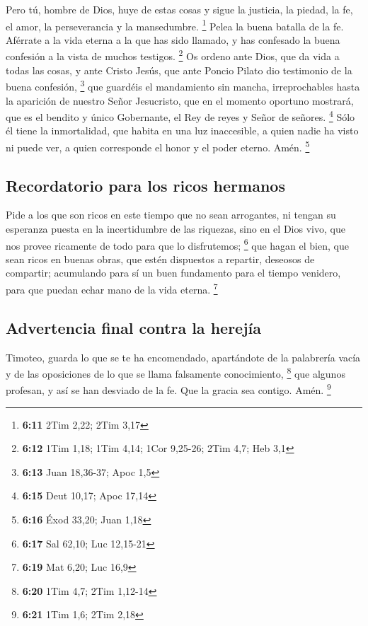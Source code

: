 \begin{paracol}{2}
 Pero tú, hombre de Dios, huye de estas cosas y sigue la
justicia, la piedad, la fe, el amor, la perseverancia y la mansedumbre.
\footnote{\textbf{6:11} 2Tim 2,22; 2Tim 3,17}  Pelea la
buena batalla de la fe. Aférrate a la vida eterna a la que has sido
llamado, y has confesado la buena confesión a la vista de muchos
testigos. \footnote{\textbf{6:12} 1Tim 1,18; 1Tim 4,14; 1Cor 9,25-26;
  2Tim 4,7; Heb 3,1}  Os ordeno ante Dios, que da vida a
todas las cosas, y ante Cristo Jesús, que ante Poncio Pilato dio
testimonio de la buena confesión, \footnote{\textbf{6:13} Juan 18,36-37;
  Apoc 1,5}  que guardéis el mandamiento sin mancha,
irreprochables hasta la aparición de nuestro Señor Jesucristo,
 que en el momento oportuno mostrará, que es el bendito y
único Gobernante, el Rey de reyes y Señor de señores. \footnote{\textbf{6:15}
  Deut 10,17; Apoc 17,14}  Sólo él tiene la inmortalidad,
que habita en una luz inaccesible, a quien nadie ha visto ni puede ver,
a quien corresponde el honor y el poder eterno. Amén. \footnote{\textbf{6:16}
  Éxod 33,20; Juan 1,18}

\hypertarget{recordatorio-para-los-ricos-hermanos}{%
\subsection{Recordatorio para los ricos
hermanos}\label{recordatorio-para-los-ricos-hermanos}}

 Pide a los que son ricos en este tiempo que no sean
arrogantes, ni tengan su esperanza puesta en la incertidumbre de las
riquezas, sino en el Dios vivo, que nos provee ricamente de todo para
que lo disfrutemos; \footnote{\textbf{6:17} Sal 62,10; Luc 12,15-21}
 que hagan el bien, que sean ricos en buenas obras, que
estén dispuestos a repartir, deseosos de compartir; 
acumulando para sí un buen fundamento para el tiempo venidero, para que
puedan echar mano de la vida eterna. \footnote{\textbf{6:19} Mat 6,20;
  Luc 16,9}

\hypertarget{advertencia-final-contra-la-herejuxeda}{%
\subsection{Advertencia final contra la
herejía}\label{advertencia-final-contra-la-herejuxeda}}

 Timoteo, guarda lo que se te ha encomendado, apartándote
de la palabrería vacía y de las oposiciones de lo que se llama
falsamente conocimiento, \footnote{\textbf{6:20} 1Tim 4,7; 2Tim 1,12-14}
 que algunos profesan, y así se han desviado de la fe.
Que la gracia sea contigo. Amén. \footnote{\textbf{6:21} 1Tim 1,6; 2Tim
  2,18} \switchcolumn \begin{otherlanguage}{english}


\end{otherlanguage}
\end{paracol}
